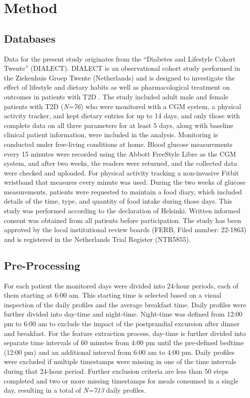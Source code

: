 \section{Method}
\label{Method}

\subsection{Databases}

Data for the present study originates from the “Diabetes and Lifestyle Cohort Twente” (DIALECT). DIALECT is an observational cohort study performed in the  Ziekenhuis Groep Twente (Netherlands) and is designed to investigate the effect of lifestyle and dietary habits as well as pharmacological treatment on outcomes in patients with T2D \cite{gant2017integrated}. The study included adult male and female patients with T2D (\textit{N=76}) who were monitored with a CGM system, a physical activity tracker, and kept dietary entries for up to 14 days, and only those with complete data on all three parameters for at least 5 days, along with baseline clinical patient information, were included in the analysis. Monitoring is conducted under free-living conditions at home. Blood glucose measurements every 15 minutes were recorded using the Abbott FreeStyle Libre as the CGM system, and after two weeks, the readers were returned, and the collected data were checked and uploaded. For physical activity tracking a non-invasive Fitbit wristband that measures every minute was used. During the two weeks of glucose measurements, patients were requested to maintain a food diary, which included details of the time, type, and quantity of food intake during those days.
This study was performed according to the declaration of Helsinki. Written informed consent was obtained from all patients before participation. The study has been approved by the local institutional review boards (FERB, Filed number: 22-1863) and is registered in the Netherlands Trial Register (NTR5855).

\subsection{Pre-Processing} \label{Pre-Processing}

For each patient the monitored days were divided into 24-hour periods, each of them starting at 6:00 am. This starting time is selected based on a visual inspection of the daily profiles and the average breakfast time. Daily profiles were further divided into day-time and night-time. Night-time was defined from 12:00 pm to 6:00 am to exclude the impact of the postprandial excursion after dinner and breakfast. For the feature extraction process, day-time is further divided into separate time intervals of 60 minutes from 4:00 pm until the pre-defined bedtime (12:00 pm) and an additional interval from 6:00 am to 4:00 pm. Daily profiles were excluded if multiple timestamps were missing in one of the time intervals during that 24-hour period. Further exclusion criteria are less than 50 steps completed and two or more missing timestamps for meals consumed in a single day, resulting in a total of \textit{N=713} daily profiles.

